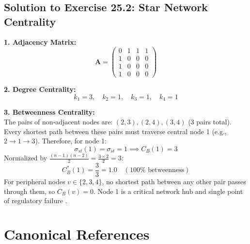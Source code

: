 \documentclass[11pt,oneside]{book}
\begin{document}
\subsection*{Solution to Exercise 25.2: Star Network Centrality}

\textbf{1. Adjacency Matrix:}\\
$$\mathbf{A} = \begin{pmatrix} 0 & 1 & 1 & 1 \\ 1 & 0 & 0 & 0 \\ 1 & 0 & 0 & 0 \\ 1 & 0 & 0 & 0 \end{pmatrix}$$

\textbf{2. Degree Centrality:}\\
$$k_1 = 3, \quad k_2 = 1, \quad k_3 = 1, \quad k_4 = 1$$

\textbf{3. Betweenness Centrality:}\\
The pairs of non-adjacent nodes are: $(2, 3), (2, 4), (3, 4)$ (3 pairs total).
Every shortest path between these pairs must traverse central node 1 (e.g., $2 \to 1 \to 3$).
Therefore, for node 1:
$$\sigma_{st}(1) = \sigma_{st} = 1 \implies C_B(1) = 3$$
Normalized by $\frac{(n-1)(n-2)}{2} = \frac{3 \times 2}{2} = 3$:
$$C_B^*(1) = \frac{3}{3} = 1.0 \quad (100\% \text{ betweenness})$$
For peripheral nodes $v \in \{2, 3, 4\}$, no shortest path between any other pair passes through them, so $C_B(v) = 0$. Node 1 is a critical network hub and single point of regulatory failure \cite{barabasi2004network}.

\section*{Canonical References}
\end{document}
